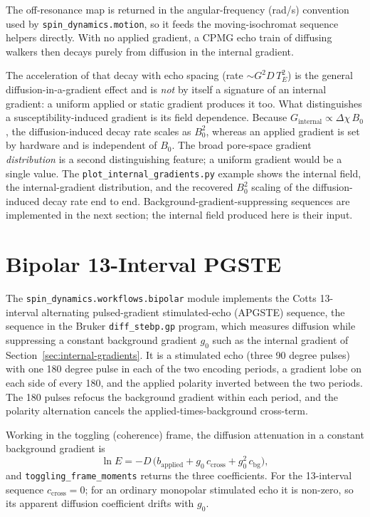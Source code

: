 \documentclass[11pt,oneside]{report}
\newcommand{\code}[1]{\texttt{#1}}
\begin{document}
The off-resonance map is returned in the angular-frequency (rad/s) convention
used by \code{spin\_dynamics.motion}, so it feeds the moving-isochromat sequence
helpers directly. With no applied gradient, a CPMG echo train of diffusing
walkers then decays purely from diffusion in the internal gradient.

The acceleration of that decay with echo spacing (rate
\(\sim G^2 D\, T_E^2\)) is the general diffusion-in-a-gradient effect and is
\emph{not} by itself a signature of an internal gradient: a uniform applied or
static gradient produces it too. What distinguishes a susceptibility-induced
gradient is its field dependence. Because \(G_\mathrm{internal} \propto
\Delta\chi\, B_0\), the diffusion-induced decay rate scales as \(B_0^2\), whereas
an applied gradient is set by hardware and is independent of \(B_0\). The broad
pore-space gradient \emph{distribution} is a second distinguishing feature; a
uniform gradient would be a single value. The \code{plot\_internal\_gradients.py}
example shows the internal field, the internal-gradient distribution, and the
recovered \(B_0^2\) scaling of the diffusion-induced decay rate end to end.
Background-gradient-suppressing sequences are implemented in the next section;
the internal field produced here is their input.

\section{Bipolar 13-Interval PGSTE}
\label{sec:bipolar-pgste}

The \code{spin\_dynamics.workflows.bipolar} module implements the Cotts
13-interval alternating pulsed-gradient stimulated-echo (APGSTE) sequence, the
sequence in the Bruker \code{diff\_stebp.gp} program, which measures diffusion
while suppressing a constant background gradient \(g_0\) such as the internal
gradient of Section~\ref{sec:internal-gradients}. It is a stimulated echo (three
90 degree pulses) with one 180 degree pulse in each of the two encoding periods,
a gradient lobe on each side of every 180, and the applied polarity inverted
between the two periods. The 180 pulses refocus the background gradient within
each period, and the polarity alternation cancels the applied-times-background
cross-term.

Working in the toggling (coherence) frame, the diffusion attenuation in a
constant background gradient is
\[
  \ln E = -D\,\bigl(b_\mathrm{applied}
            + g_0\, c_\mathrm{cross}
            + g_0^2\, c_\mathrm{bg}\bigr),
\]
and \code{toggling\_frame\_moments} returns the three coefficients. For the
13-interval sequence \(c_\mathrm{cross} = 0\); for an ordinary monopolar
stimulated echo it is non-zero, so its apparent diffusion coefficient drifts
with \(g_0\).
\end{document}
